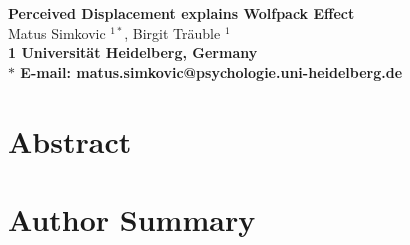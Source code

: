 \documentclass[10pt]{article}
\date{}
\begin{document}
\begin{flushleft}
{\Large
\textbf{Perceived Displacement explains Wolfpack Effect}
}
\\
Matus Simkovic $^{1\ast}$, 
Birgit Tr\"auble $^{1}$
\\
\bf{1}  Universit\"at Heidelberg, Germany
\\
$\ast$ E-mail: matus.simkovic@psychologie.uni-heidelberg.de
\end{flushleft}

\section*{Abstract}

\section*{Author Summary}
\end{document}
